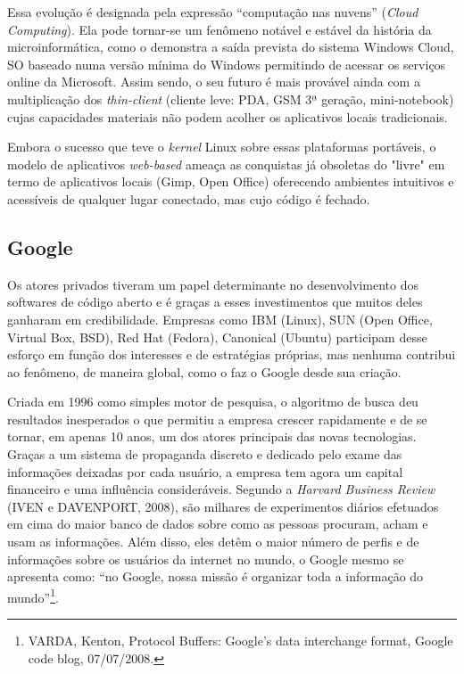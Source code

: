 Essa evolução é designada pela expressão “computação nas nuvens” (\emph{Cloud Computing}). Ela pode tornar-se um fenômeno notável e estável da história da microinformática, como o demonstra a saída prevista do sistema Windows Cloud, SO baseado numa versão mínima do Windows permitindo de acessar os serviços online da Microsoft. Assim sendo, o seu futuro é mais provável ainda com a multiplicação dos \emph{thin-client} (cliente leve: PDA, GSM 3ª geração, mini-notebook) cujas capacidades materiais não podem acolher os aplicativos locais tradicionais.

Embora o sucesso que teve o \emph{kernel} Linux sobre essas plataformas portáveis, o modelo de aplicativos \emph{web-based} ameaça as conquistas já obsoletas do "livre" em termo de aplicativos locais (Gimp, Open Office) oferecendo ambientes intuitivos e acessíveis de qualquer lugar conectado, mas cujo código é fechado.

\subsection{Google} \label{1.4.3}

Os atores privados tiveram um papel determinante no desenvolvimento dos softwares de código aberto e é graças a esses investimentos que muitos deles ganharam em credibilidade. Empresas como IBM (Linux), SUN (Open Office, Virtual Box, BSD), Red Hat (Fedora), Canonical (Ubuntu) participam desse esforço em função dos interesses e de estratégias próprias, mas nenhuma contribui ao fenômeno, de maneira global, como o faz o Google desde sua criação.

Criada em 1996 como simples motor de pesquisa, o algoritmo de busca deu resultados inesperados o que permitiu a empresa crescer rapidamente e de se tornar, em apenas 10 anos, um dos atores principais das novas tecnologias. Graças a um sistema de propaganda discreto e dedicado pelo exame das informações deixadas por cada usuário, a empresa tem agora um capital financeiro e uma influência consideráveis. Segundo a \emph{Harvard Business Review} (IVEN e DAVENPORT, 2008), são milhares de experimentos diários efetuados em cima do maior banco de dados sobre como as pessoas procuram, acham e usam as informações. Além disso, eles detêm o maior número de perfis e de informações sobre os usuários da internet no mundo, o Google mesmo se apresenta como: “no Google, nossa missão é organizar toda a informação do mundo”\footnote{VARDA, Kenton, Protocol Buffers: Google’s data interchange format, Google code blog, 07/07/2008.}.

